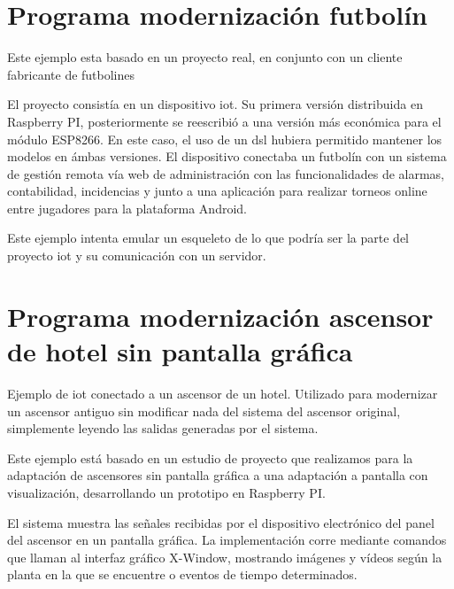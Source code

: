 \section{Programa modernización futbolín}
\label{appendix:ejemplo_dsl_futbolin}

Este ejemplo esta basado en un proyecto real, en conjunto con un cliente fabricante de futbolines

El proyecto consistía en un dispositivo \gls{iot}. Su primera versión distribuida en Raspberry PI, posteriormente se reescribió a una versión más económica para el módulo ESP8266. En este caso, el uso de un \gls{dsl} hubiera permitido mantener los modelos en ámbas versiones. El dispositivo conectaba un futbolín con un sistema de gestión remota vía web de
administración  con las funcionalidades de alarmas, contabilidad, incidencias y junto a una aplicación para realizar torneos online entre jugadores para la plataforma Android.

Este ejemplo intenta emular un esqueleto de lo que podría ser la parte del proyecto \gls{iot} y su comunicación con un servidor.





\section{Programa modernización ascensor de hotel sin pantalla gráfica}
\label{appendix:ejemplo_dsl_ascensor}

Ejemplo de \gls{iot} conectado a un ascensor de un hotel.
Utilizado para modernizar un ascensor antiguo sin modificar nada del sistema del ascensor original, simplemente leyendo las salidas generadas por el sistema.

Este ejemplo está basado en un estudio de proyecto que realizamos para la adaptación de ascensores sin pantalla gráfica a una adaptación a pantalla con visualización, desarrollando un prototipo en Raspberry PI.

El sistema muestra las señales recibidas por el dispositivo electrónico del panel del ascensor en un pantalla gráfica.
La implementación corre mediante comandos que llaman al interfaz gráfico X-Window, mostrando imágenes y vídeos según la planta en la que se encuentre o eventos de tiempo determinados.  


